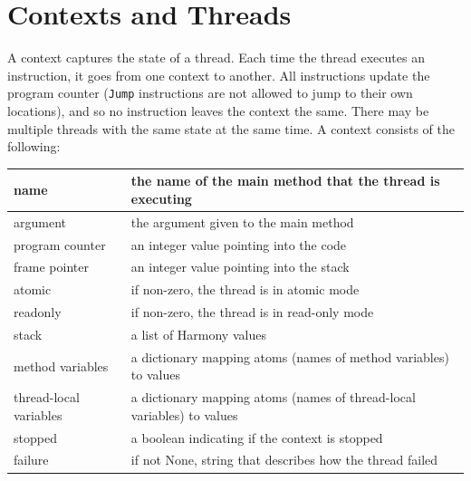\documentclass{report}
\begin{document}
\chapter{Contexts and Threads}
\label{app:context}

A context captures the state of a thread.  Each time the thread
executes an instruction, it goes from one context to another.
All instructions update the program counter (\texttt{Jump} instructions
are not allowed to jump to their own locations), and so no instruction
leaves the context the same.
There may be multiple threads
with the same state at the same time.
A context consists of the following:

\vspace{1em}
\begin{tabular}{|l|l|}
\hline
name & the name of the main method that the thread is executing \\
\hline
argument & the argument given to the main method \\
\hline
program counter & an integer value pointing into the code \\
\hline
frame pointer & an integer value pointing into the stack \\
\hline
atomic & if non-zero, the thread is in atomic mode \\
\hline
readonly & if non-zero, the thread is in read-only mode \\
\hline
stack & a list of Harmony values \\
\hline
method variables & a dictionary mapping atoms (names of method variables) to values \\
\hline
thread-local variables & a dictionary mapping atoms (names of thread-local variables) to values \\
\hline
stopped & a boolean indicating if the context is stopped \\
\hline
failure & if not None, string that describes how the thread failed \\
\hline
\end{tabular}
\vspace{1em}
\end{document}
